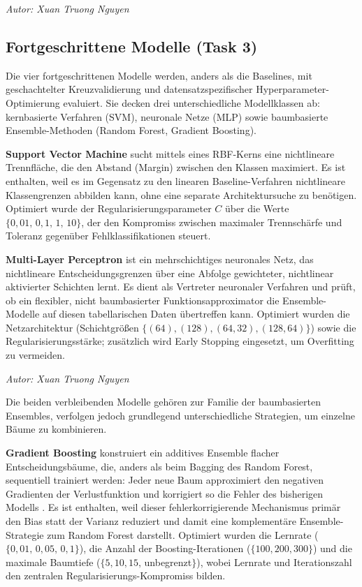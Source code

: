 \documentclass[10pt]{scrartcl}
\begin{document}
\begin{flushright}\textit{Autor: Xuan Truong Nguyen}\end{flushright}

\subsection{Fortgeschrittene Modelle (Task 3)}
\label{sec:advanced-models}

Die vier fortgeschrittenen Modelle werden, anders als die Baselines, mit geschachtelter Kreuzvalidierung und datensatzspezifischer Hyperparameter-Optimierung evaluiert. Sie decken drei unterschiedliche Modellklassen ab: kernbasierte Verfahren (SVM), neuronale Netze (MLP) sowie baumbasierte Ensemble-Methoden (Random Forest, Gradient Boosting).

\textbf{Support Vector Machine} \cite{HastieESL2009} sucht mittels eines RBF-Kerns eine nichtlineare Trennfläche, die den Abstand (Margin) zwischen den Klassen maximiert. Es ist enthalten, weil es im Gegensatz zu den linearen Baseline-Verfahren nichtlineare Klassengrenzen abbilden kann, ohne eine separate Architektursuche zu benötigen. Optimiert wurde der Regularisierungsparameter $C$ über die Werte $\{0{,}01,\, 0{,}1,\, 1,\, 10\}$, der den Kompromiss zwischen maximaler Trennschärfe und Toleranz gegenüber Fehlklassifikationen steuert.

\textbf{Multi-Layer Perceptron} \cite{BishopPRML2006} ist ein mehrschichtiges neuronales Netz, das nichtlineare Entscheidungsgrenzen über eine Abfolge gewichteter, nichtlinear aktivierter Schichten lernt. Es dient als Vertreter neuronaler Verfahren und prüft, ob ein flexibler, nicht baumbasierter Funktionsapproximator die Ensemble-Modelle auf diesen tabellarischen Daten übertreffen kann. Optimiert wurden die Netzarchitektur (Schichtgrößen $\{(64), (128), (64,32), (128,64)\}$) sowie die Regularisierungsstärke; zusätzlich wird Early Stopping eingesetzt, um Overfitting zu vermeiden.

\begin{flushright}\textit{Autor: Xuan Truong Nguyen}\end{flushright}

Die beiden verbleibenden Modelle gehören zur Familie der baumbasierten Ensembles, verfolgen jedoch grundlegend unterschiedliche Strategien, um einzelne Bäume zu kombinieren.

\textbf{Gradient Boosting} konstruiert ein additives Ensemble flacher Entscheidungsbäume, die, anders als beim Bagging des Random Forest, sequentiell trainiert werden: Jeder neue Baum approximiert den negativen Gradienten der Verlustfunktion und korrigiert so die Fehler des bisherigen Modells \cite{Friedman2001}. Es ist enthalten, weil dieser fehlerkorrigierende Mechanismus primär den Bias statt der Varianz reduziert und damit eine komplementäre Ensemble-Strategie zum Random Forest darstellt. Optimiert wurden die Lernrate ($\{0{,}01,\, 0{,}05,\, 0{,}1\}$), die Anzahl der Boosting-Iterationen ($\{100, 200, 300\}$) und die maximale Baumtiefe ($\{5, 10, 15,\,$unbegrenzt$\}$), wobei Lernrate und Iterationszahl den zentralen Regularisierungs-Kompromiss bilden.
\end{document}
